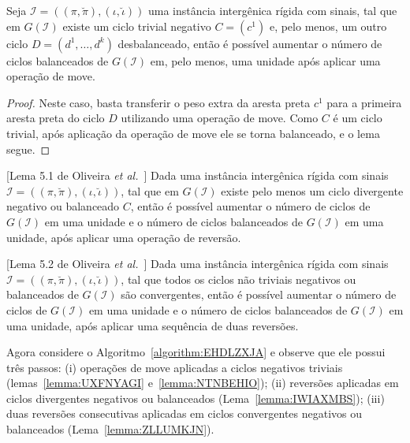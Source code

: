\begin{lemma}\label{lemma:NTNBEHIO}
Seja $\mathcal{I} = ((\pi,\breve\pi),(\iota,\breve\iota))$ uma instância intergênica rígida com sinais, tal que em $G(\mathcal{I})$ existe um ciclo trivial negativo $C=(c^1)$ e, pelo menos, um outro ciclo $D=(d^1,\dots,d^k)$ desbalanceado, então é possível aumentar o número de ciclos balanceados de $G(\mathcal{I})$ em, pelo menos, uma unidade após aplicar uma operação de move.
\end{lemma}
\begin{proof}
Neste caso, basta transferir o peso extra da aresta preta $c^1$ para a primeira aresta preta do ciclo $D$ utilizando uma operação de move. Como $C$ é um ciclo trivial, após aplicação da operação de move ele se torna balanceado, e o lema segue.
\end{proof}

\begin{lemma}\label{lemma:IWIAXMBS}[Lema 5.1 de Oliveira \textit{et al.}~\cite{2021b-oliveira-etal}]
Dada uma instância intergênica rígida com sinais $\mathcal{I}=((\pi,\breve\pi),(\iota,\breve\iota))$, tal que em $G(\mathcal{I})$ existe pelo menos um ciclo divergente negativo ou balanceado $C$, então é possível aumentar o número de ciclos de $G(\mathcal{I})$ em uma unidade e o número de ciclos balanceados de $G(\mathcal{I})$ em uma unidade, após aplicar uma operação de reversão.
\end{lemma}

\begin{lemma}\label{lemma:ZLLUMKJN}[Lema 5.2 de Oliveira \textit{et al.}~\cite{2021b-oliveira-etal}]
Dada uma instância intergênica rígida com sinais $\mathcal{I}=((\pi,\breve\pi),(\iota,\breve\iota))$, tal que todos os ciclos não triviais negativos ou balanceados de $G(\mathcal{I})$ são convergentes, então é possível aumentar o número de ciclos de $G(\mathcal{I})$ em uma unidade e o número de ciclos balanceados de $G(\mathcal{I})$ em uma unidade, após aplicar uma sequência de duas reversões.
\end{lemma}

Agora considere o Algoritmo~\ref{algorithm:EHDLZXJA} e observe que ele possui três passos: (i) operações de move aplicadas a ciclos negativos triviais (lemas~\ref{lemma:UXFNYAGI} e~\ref{lemma:NTNBEHIO}); (ii) reversões aplicadas em ciclos divergentes negativos ou balanceados (Lema~\ref{lemma:IWIAXMBS}); (iii) duas reversões consecutivas aplicadas em ciclos convergentes negativos ou balanceados (Lema~\ref{lemma:ZLLUMKJN}).

